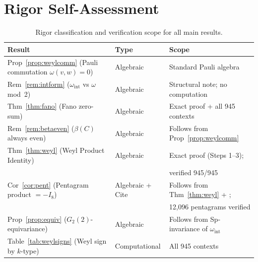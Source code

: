 \documentclass[11pt,a4paper]{article}
\theoremstyle{remark}
\begin{document}
\appendix
\setcounter{table}{4}
\renewcommand{\thetable}{A\arabic{table}}
\renewcommand{\theHtable}{A\arabic{table}}
\section{Rigor Self-Assessment}

\begin{table}[H]
\centering
\caption{Rigor classification and verification scope for all main results.}
\label{tab:rigor}
\begin{tabular}{p{6cm}lp{4cm}}
\toprule
Result & Type & Scope \\
\midrule
Prop~\ref{prop:weylcomm} (Pauli commutation $\omega(v,w)=0$)
  & Algebraic & Standard Pauli algebra \\
Rem~\ref{rem:intform} ($\omega_{\mathrm{int}}$ vs $\omega$ mod~2)
  & Algebraic & Structural note; no computation \\
Thm~\ref{thm:fano} (Fano zero-sum)
  & Algebraic & Exact proof + all 945 contexts \cite{PaperXVIsuppl} \\
Rem~\ref{rem:betaeven} ($\beta(C)$ always even)
  & Algebraic & Follows from Prop~\ref{prop:weylcomm} \\
Thm~\ref{thm:weyl} (Weyl Product Identity)
  & Algebraic & Exact proof (Steps 1--3); \\
& & verified 945/945 \cite{PaperXVIsuppl} \\
Cor~\ref{cor:pent} (Pentagram product $= -I_8$)
  & Algebraic + Cite & Follows from Thm~\ref{thm:weyl} + \cite{PaperXI}; \\
& & 12,096 pentagrams verified \cite{PaperXVIsuppl} \\
Prop~\ref{prop:equiv} ($G_2(2)$-equivariance)
  & Algebraic & Follows from Sp-invariance of $\omega_{\mathrm{int}}$ \\
Table~\ref{tab:weylsigns} (Weyl sign by $k$-type)
  & Computational & All 945 contexts \cite{PaperXVIsuppl} \\
\bottomrule
\end{tabular}
\end{table}
\end{document}
